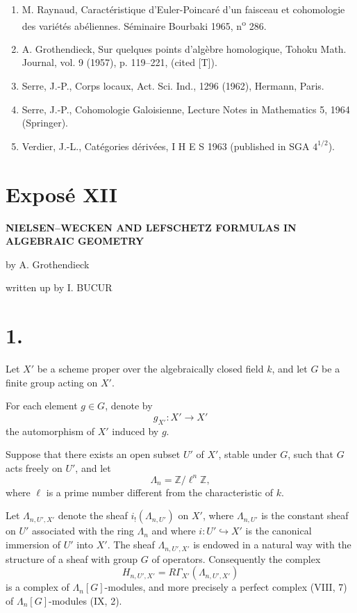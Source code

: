 \documentclass[11pt]{article}
\providecommand{\La}{\Lambda}
\providecommand{\bZ}{\mathbb Z}
\begin{document}
\begin{enumerate}
\item[{[1]}] M. Raynaud, Caractéristique d'Euler-Poincaré d'un faisceau et cohomologie des variétés abéliennes. Séminaire Bourbaki 1965, n\textsuperscript{o} 286.
\item[{[2]}] A. Grothendieck, Sur quelques points d'algèbre homologique, Tohoku Math. Journal, vol. 9 (1957), p. 119--221, (cited [T]).
\item[{[3]}] Serre, J.-P., Corps locaux, Act. Sci. Ind., 1296 (1962), Hermann, Paris.
\item[{[4]}] Serre, J.-P., Cohomologie Galoisienne, Lecture Notes in Mathematics 5, 1964 (Springer).
\item[{[5]}] Verdier, J.-L., Catégories dérivées, I H E S 1963 (published in SGA $4^{1/2}$).
\end{enumerate}


\section*{Exposé XII}

\begin{center}
\Large\bfseries NIELSEN--WECKEN AND LEFSCHETZ FORMULAS IN ALGEBRAIC GEOMETRY
\end{center}

\begin{center}
by A. Grothendieck

written up by I. BUCUR
\end{center}

\bigskip

\section*{1.}
Let $X'$ be a scheme proper over the algebraically closed field $k$, and let $G$ be a finite group acting on $X'$.

For each element $g\in G$, denote by
\[
g_{X'}:X'\to X'
\]
the automorphism of $X'$ induced by $g$.

Suppose that there exists an open subset $U'$ of $X'$, stable under $G$, such that $G$ acts freely on $U'$, and let
\[
\La_n=\bZ/\ell^n\bZ,
\]
where $\ell$ is a prime number different from the characteristic of $k$.

Let $\La_{n,U',X'}$ denote the sheaf $i_!(\La_{n,U'})$ on $X'$, where $\La_{n,U'}$ is the constant sheaf on $U'$ associated with the ring $\La_n$ and where $i:U'\hookrightarrow X'$ is the canonical immersion of $U'$ into $X'$. The sheaf $\La_{n,U',X'}$ is endowed in a natural way with the structure of a sheaf with group $G$ of operators. Consequently the complex
\[
H_{n,U',X'}=R\Gamma_{X'}(\La_{n,U',X'})
\]
is a complex of $\La_n[G]$-modules, and more precisely a perfect complex (VIII, 7) of $\La_n[G]$-modules (IX, 2).
\end{document}
